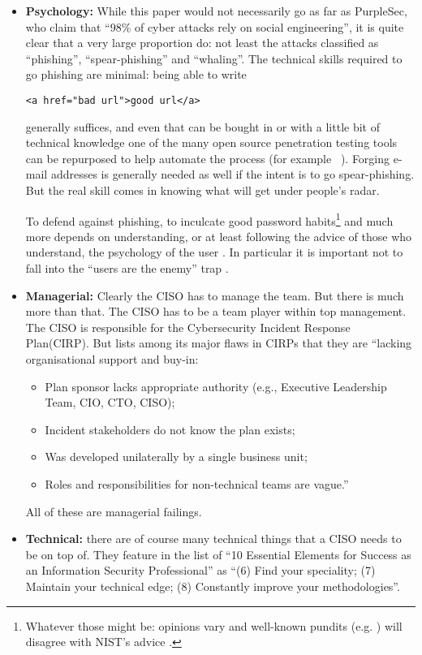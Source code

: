 \documentclass[conference]{IEEEtran}
\begin{document}
\begin{itemize}
\item{\bf Psychology:} While this paper would not necessarily go as far as PurpleSec, who claim \cite{PurpleSec2020a} that ``98\% of cyber attacks rely on social engineering'', it is quite clear that a very large proportion do: not least the attacks classified as ``phishing'', ``spear-phishing'' and ``whaling''. The technical skills required to go phishing are minimal: being able to write
\begin{verbatim}
<a href="bad url">good url</a>
\end{verbatim}
generally suffices, and even that can be bought in or with a little bit of technical knowledge one of the many open source penetration testing tools can be repurposed to help automate the process (for example ~\cite{goPhish,king-Phisher}).  Forging e-mail addresses is generally needed as well if the intent is to go spear-phishing. But the real skill comes in knowing what will get under people's radar.
\par
To defend against phishing, to inculcate good password habits\footnote{Whatever those might be: opinions vary and well-known pundits (e.g. \cite{Grimes2019b}) will disagree with NIST's advice \cite{NIST2019e}.} and much more depends on understanding, or at least following the advice of those who understand, the psychology of the user \cite{InglesantSasse2010a}. In particular it is important not to fall into the ``users are the enemy'' trap \cite{AdamsSasse1999}.
\item{\bf Managerial:} Clearly the CISO has to manage the team. But there is much more than that. The CISO has to be a team player within top management. The CISO is responsible for the Cybersecurity Incident Response Plan(CIRP). But \cite{Secureworks2019a} lists among its major flaws in CIRPs that they are ``lacking organisational support and buy-in:
\begin{itemize}
\item Plan sponsor lacks appropriate authority
(e.g., Executive Leadership Team, CIO, CTO, CISO);
\item Incident stakeholders do not know the plan exists;
\item Was developed unilaterally by a single business unit;
\item Roles and responsibilities for non-technical teams are vague.''
\end{itemize}
All of these are managerial failings.
\item{\bf Technical:} there are of course many technical things that a CISO needs to be on top of.  They feature in the list \cite{Beaver2017a} of ``10 Essential Elements for Success as an Information Security Professional'' as ``(6) Find your speciality; (7) Maintain your technical edge; (8) Constantly improve your methodologies''.


\end{itemize}
\end{document}
